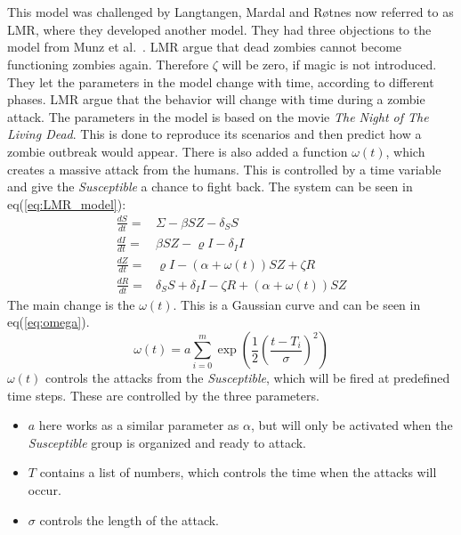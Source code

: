 \documentclass[%
twoside,                 %
final,                   %
chapterprefix=true,      %
open=right               %
10pt]{book}
\begin{document}
\noindent
\\
\\
This model was challenged by Langtangen, Mardal and Røtnes \cite{zombie-math} now referred to as LMR, where they developed another model. They had three objections to the model from Munz et al.~\cite{munz2009zombies}. LMR argue that dead zombies cannot become functioning zombies again. Therefore $\zeta$ will be zero, if magic is not introduced. They let the parameters in the model change with time, according to different phases. LMR argue that the behavior will change with time during a zombie attack. The parameters in the model is based on the movie \emph{The Night of The Living Dead}. This is done to reproduce its scenarios and then predict how a zombie outbreak would appear. There is also added a function $\omega(t)$, which creates a massive attack from the humans. This is controlled by a time variable and give the \emph{Susceptible} a chance to fight back. The system can be seen in eq(\ref{eq:LMR_model}):
\begin{equation} \label{eq:LMR_model}
	\begin{aligned} 
	\frac{dS}{dt} =& \Sigma -\beta SZ - \delta_SS \\
	\frac{dI}{dt} =& \beta SZ - \varrho I - \delta_II\\
	\frac{dZ}{dt} =& \varrho I- (\alpha+\omega(t))SZ + \zeta R\\
	\frac{dR}{dt} =& \delta_SS +\delta_II -\zeta R + (\alpha+\omega(t))SZ 
	\end{aligned}
\end{equation}
The main change is the $\omega(t)$. This is a Gaussian curve and can be seen in eq(\ref{eq:omega}).
\begin{equation} \label{eq:omega}
\omega(t) = a \sum^m_{i=0}\exp\left(\frac{1}{2}\left(\frac{t-T_i}{\sigma}\right)^2\right)
\end{equation}
$\omega(t)$ controls the attacks from the \emph{Susceptible}, which will be fired at predefined time steps. These are controlled by the three parameters. 
\begin{itemize}
\item $a$ here works as a similar parameter as $\alpha$, but will only be activated when the \emph{Susceptible} group is organized and ready to attack. 

\item $T$ contains a list of numbers, which controls the time when the attacks will occur.

\item $\sigma$ controls the length of the attack. 
\end{itemize}
\end{document}
